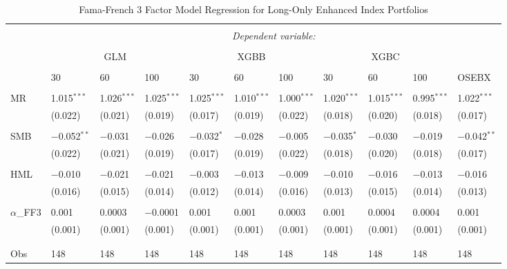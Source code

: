\begin{table}[H] \centering 
  \caption{Fama-French 3 Factor Model Regression for Long-Only Enhanced Index Portfolios} 
  \subcaption*{}
  \label{} 
\begin{tabularx}{\textwidth}{XXXXXXXXXXl} 
\\[-1.8ex]\hline 
\hline \\[-1.8ex] 
 & \multicolumn{10}{c}{\textit{Dependent variable:}} \\ 
\cline{2-11} 
\\[-1.8ex] 
 & \multicolumn{3}{c}{GLM} & \multicolumn{3}{c}{XGBB} & \multicolumn{3}{c}{XGBC} & \\
 \cline{2-10}
 \\[-1.8ex] 
 & 30 & 60 & 100 & 30 & 60 & 100 & 30 & 60 & 100 & OSEBX \\ 
 \cline{2-10} \\ 
 MR & 1.015$^{***}$ & 1.026$^{***}$ & 1.025$^{***}$ & 1.025$^{***}$ & 1.010$^{***}$ & 1.000$^{***}$ & 1.020$^{***}$ & 1.015$^{***}$ & 0.995$^{***}$ & 1.022$^{***}$ \\ 
  & (0.022) & (0.021) & (0.019) & (0.017) & (0.019) & (0.022) & (0.018) & (0.020) & (0.018) & (0.017) \\ 
  & & & & & & & & & & \\ 
 SMB & $-$0.052$^{**}$ & $-$0.031 & $-$0.026 & $-$0.032$^{*}$ & $-$0.028 & $-$0.005 & $-$0.035$^{*}$ & $-$0.030 & $-$0.019 & $-$0.042$^{**}$ \\ 
  & (0.022) & (0.021) & (0.019) & (0.017) & (0.019) & (0.022) & (0.018) & (0.020) & (0.018) & (0.017) \\ 
  & & & & & & & & & & \\ 
 HML & $-$0.010 & $-$0.021 & $-$0.021 & $-$0.003 & $-$0.013 & $-$0.009 & $-$0.010 & $-$0.016 & $-$0.013 & $-$0.016 \\ 
  & (0.016) & (0.015) & (0.014) & (0.012) & (0.014) & (0.016) & (0.013) & (0.015) & (0.014) & (0.013) \\ 
  & & & & & & & & & & \\ 
 $\alpha$_{FF3} & 0.001 & 0.0003 & $-$0.0001 & 0.001 & 0.001 & 0.0003 & 0.001 & 0.0004 & 0.0004 & 0.001 \\ 
  & (0.001) & (0.001) & (0.001) & (0.001) & (0.001) & (0.001) & (0.001) & (0.001) & (0.001) & (0.001) \\ 
  & & & & & & & & & & \\ 
\hline \\[-1.8ex] 
Obs & 148 & 148 & 148 & 148 & 148 & 148 & 148 & 148 & 148 & 148 \\ 

\end{tabularx}
\end{table}

